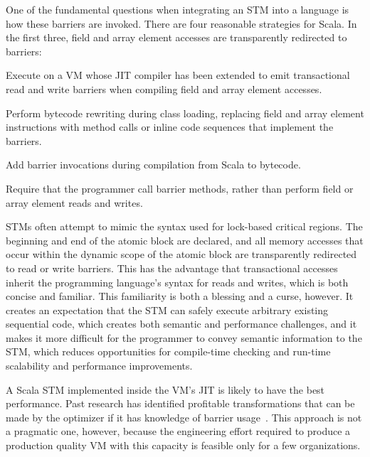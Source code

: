 One of the
fundamental questions when integrating an STM into a language is how these
barriers are invoked.  There are four reasonable strategies for Scala.  In the
first three, field and array element accesses are transparently redirected to
barriers:
\begin{packed_enum}

\item Execute on a VM whose JIT compiler has been extended to emit
transactional read and write barriers when compiling field and array element
accesses.

\item Perform bytecode rewriting during class loading, replacing field and
array element instructions with method calls or inline code sequences that
implement the barriers.

\item Add barrier invocations during compilation from Scala to bytecode.

\item Require that the programmer call barrier methods, rather than perform
field or array element reads and writes.

\end{packed_enum}

STMs often attempt to mimic the syntax used for lock-based critical
regions.  The beginning and end of the atomic block are declared, and all
memory accesses that occur within the dynamic scope of the atomic block
are transparently redirected to read or write barriers.  This has the
advantage that transactional accesses inherit the programming language's
syntax for reads and writes, which is both concise and familiar.
This familiarity is both a blessing and a curse, however.  It creates an
expectation that the STM can safely execute arbitrary existing sequential
code, which creates both semantic and performance challenges, and it
makes it more difficult for the programmer to convey semantic information
to the STM, which reduces opportunities for compile-time checking and
run-time scalability and performance improvements.

A Scala STM implemented inside the VM's JIT is likely to have the best
performance.  Past research has identified profitable transformations
that can be made by the optimizer if it has knowledge of barrier
usage~\cite{?}.  This approach is not a pragmatic one, however, because
the engineering effort required to produce a production quality VM with
this capacity is feasible only for a few organizations.

